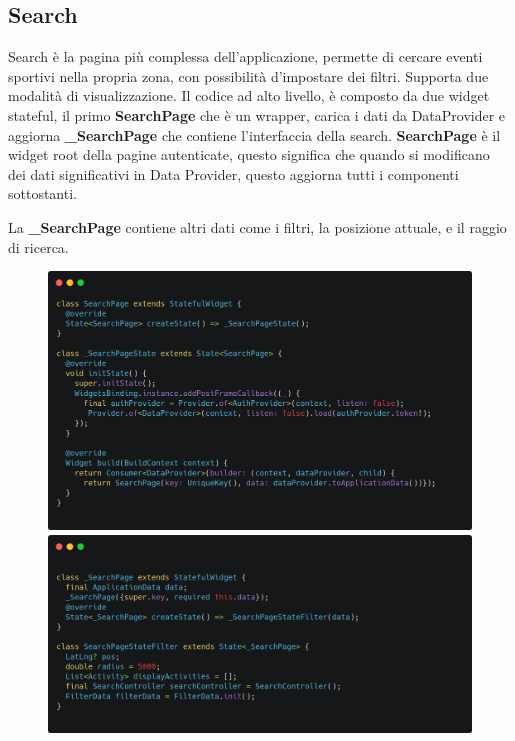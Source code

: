 \documentclass[a4paper,12pt]{article}
\begin{document}
\begin{figure}[H]
\begin{minipage}{0.40\textwidth}
    \end{minipage}
\end{figure}



\subsection{Search}
\label{sec:search}

Search è la pagina più complessa dell'applicazione, permette di cercare eventi sportivi nella propria zona, con possibilità d'impostare dei filtri. Supporta due modalità di visualizzazione. Il codice ad alto livello, è composto da due widget stateful, il primo \textbf{SearchPage} che è un wrapper, carica i dati da DataProvider e aggiorna \textbf{\_SearchPage} che contiene l'interfaccia della search.
\textbf{SearchPage} è il widget root della pagine autenticate, questo significa che quando si modificano dei dati significativi in Data Provider, questo aggiorna tutti i componenti sottostanti.

La \textbf{\_SearchPage} contiene altri dati come i filtri, la posizione attuale, e il raggio di ricerca.

\begin{figure}[H]
    \begin{minipage}{0.49\textwidth}
        \centering
        \includegraphics[width=1\linewidth]{img/search_page.png}
    \end{minipage}\hfill
    \begin{minipage}{0.49\textwidth}
        \centering
        \includegraphics[width=1\linewidth]{img/search_state.png}
    \end{minipage}
\end{figure}
\end{document}
